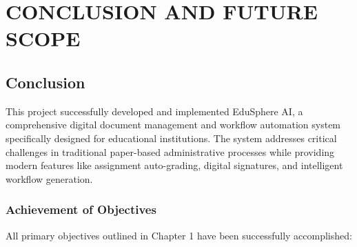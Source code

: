 \chapter{CONCLUSION AND FUTURE SCOPE}

\section{Conclusion}

This project successfully developed and implemented EduSphere AI, a comprehensive digital document management and workflow automation system specifically designed for educational institutions. The system addresses critical challenges in traditional paper-based administrative processes while providing modern features like assignment auto-grading, digital signatures, and intelligent workflow generation.

\subsection{Achievement of Objectives}

All primary objectives outlined in Chapter 1 have been successfully accomplished:

